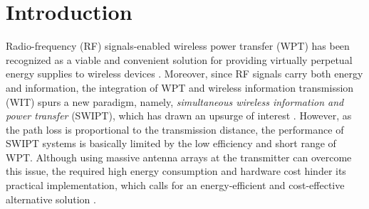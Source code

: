 \documentclass[12pt,draftclsnofoot, onecolumn]{IEEEtran}
\theoremstyle{plain}
\begin{document}
\begin{sloppypar}
\section{Introduction}
\vspace{-1mm}
Radio-frequency (RF) signals-enabled wireless power transfer (WPT) has been recognized as a viable and convenient solution for providing virtually perpetual energy supplies to wireless devices \cite{2015_Suzhi_WPT_intro}. Moreover, since RF signals carry both energy and information, the integration of WPT and wireless information transmission (WIT) spurs a new paradigm, namely, \emph{simultaneous wireless information and power transfer} (SWIPT), which has drawn an upsurge of interest \cite{2008_Varshney_SWIPT,2013_Rui_MIMO_SWIPT}. However, as the path loss is proportional to the
transmission distance, the performance of SWIPT systems is basically limited by the low efficiency and short range of WPT. Although using massive antenna arrays at the transmitter can overcome this issue, the required high energy consumption and hardware cost hinder its practical implementation, which calls for an energy-efficient and cost-effective alternative solution \cite{2017_Qingqing_overview_5G}. 


\end{sloppypar}
\end{document}
